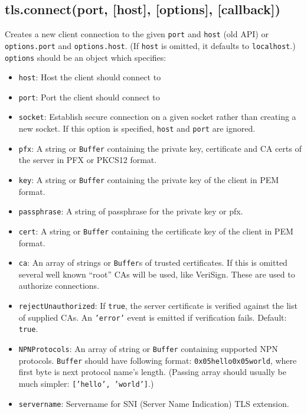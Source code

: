 \subsection{tls.connect(port, {[}host{]}, {[}options{]},
{[}callback{]})}

Creates a new client connection to the given \texttt{port} and
\texttt{host} (old API) or \texttt{options.port} and
\texttt{options.host}. (If \texttt{host} is omitted, it defaults to
\texttt{localhost}.) \texttt{options} should be an object which
specifies:

\begin{itemize}
\item
  \texttt{host}: Host the client should connect to
\item
  \texttt{port}: Port the client should connect to
\item
  \texttt{socket}: Establish secure connection on a given socket rather
  than creating a new socket. If this option is specified, \texttt{host}
  and \texttt{port} are ignored.
\item
  \texttt{pfx}: A string or \texttt{Buffer} containing the private key,
  certificate and CA certs of the server in PFX or PKCS12 format.
\item
  \texttt{key}: A string or \texttt{Buffer} containing the private key
  of the client in PEM format.
\item
  \texttt{passphrase}: A string of passphrase for the private key or
  pfx.
\item
  \texttt{cert}: A string or \texttt{Buffer} containing the certificate
  key of the client in PEM format.
\item
  \texttt{ca}: An array of strings or \texttt{Buffer}s of trusted
  certificates. If this is omitted several well known ``root'' CAs will
  be used, like VeriSign. These are used to authorize connections.
\item
  \texttt{rejectUnauthorized}: If \texttt{true}, the server certificate
  is verified against the list of supplied CAs. An \texttt{'error'}
  event is emitted if verification fails. Default: \texttt{true}.
\item
  \texttt{NPNProtocols}: An array of string or \texttt{Buffer}
  containing supported NPN protocols. \texttt{Buffer} should have
  following format: \texttt{0x05hello0x05world}, where first byte is
  next protocol name's length. (Passing array should usually be much
  simpler: \texttt{{[}'hello', 'world'{]}}.)
\item
  \texttt{servername}: Servername for SNI (Server Name Indication) TLS
  extension.
\end{itemize}

